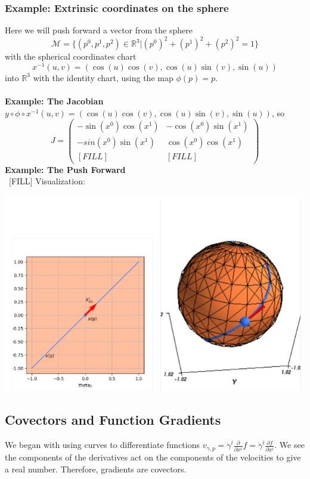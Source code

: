 \documentclass[10pt]{article}
\begin{document}
\subsubsection*{Example: Extrinsic coordinates on the sphere}
Here we will push forward a vector from the sphere
\[\mathcal{M} = \{(p^0, p^1, p^2) \in \mathbb{R}^3 | (p^0)^2 + (p^1)^2 + (p^2)^2 = 1\}\]
with the spherical coordinates chart
\[x^{-1}(u, v) = (\cos(u)\cos(v), \cos(u)\sin(v), \sin(u))\]
into $\mathbb{R}^3$ with the identity chart, using the map $\phi(p) = p$.\\\\
\textbf{Example: The Jacobian}\\
$y \circ \phi \circ x^{-1}(u, v) = (\cos(u)\cos(v), \cos(u)\sin(v), \sin(u))$, so
\[J = \begin{pmatrix}
-\sin(x^0)\cos(x^1) & -\cos(x^0)\sin(x^1) \\ -sin(x^0) \sin(x^1) & \cos(x^0) \cos(x^1) \\ [FILL] & [FILL]
\end{pmatrix}\]
\textbf{Example: The Push Forward}\\
~[FILL]
Visualization:
\begin{center}
    \includegraphics*[scale=0.8]{W6_3.png}
\end{center}

\subsection*{Covectors and Function Gradients}
We began with using curves to differentiate functions $v_{\gamma, p} = \dot{\gamma}^i \frac{\partial}{\partial x^i}f = \dot{\gamma}^i \frac{\partial f}{\partial x^i}$.  We see the components of the derivatives act on the components of the velocities to give a real number.  Therefore, gradients are covectors.
\end{document}
